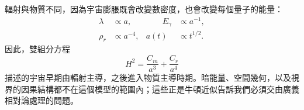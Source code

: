 輻射與物質不同，因為宇宙膨脹既會改變數密度，也會改變每個量子的能量：
\begin{equation}
\begin{aligned}
\lambda&\propto a,
&\qquad E_\gamma&\propto a^{-1},\\
\rho_r&\propto a^{-4},
& a(t)&\propto t^{1/2}.
\end{aligned}
\end{equation}
因此，雙組分方程
\begin{equation}
H^2=\frac{C_m}{a^3}+\frac{C_r}{a^4}
\end{equation}
描述的宇宙早期由輻射主導，之後進入物質主導時期。暗能量、空間幾何，以及視界的因果結構都不在這個模型的範圍內；這些正是牛頓近似告訴我們必須交由廣義相對論處理的問題。